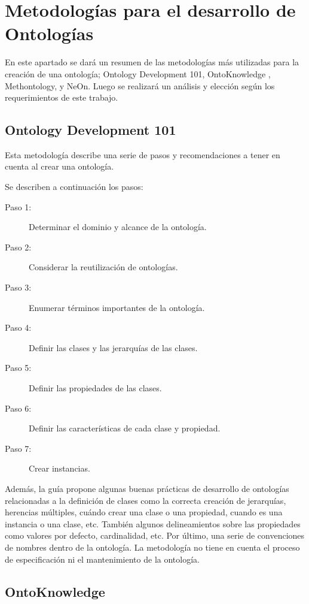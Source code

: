 \section{Metodologías para el desarrollo de Ontologías}

En este apartado se dará un resumen de las metodologías más utilizadas para la creación de una ontología; Ontology Development 101, OntoKnowledge , Methontology, y NeOn. Luego se realizará un análisis y elección según los requerimientos de este trabajo.

\subsection{Ontology Development 101}

Esta metodología describe una serie de pasos y recomendaciones a tener en cuenta al crear una ontología. 

Se describen a continuación los pasos:
\begin{description}
\item[Paso 1:] Determinar el dominio y alcance de la ontología.
\item[Paso 2:] Considerar la reutilización de ontologías.
\item[Paso 3:] Enumerar términos importantes de la ontología.
\item[Paso 4:] Definir las clases y las jerarquías de las clases.
\item[Paso 5:] Definir las propiedades de las clases.
\item[Paso 6:] Definir las características de cada clase y propiedad.
\item[Paso 7:] Crear instancias.
\end{description}

Además, la guía propone algunas buenas prácticas de desarrollo de ontologías relacionadas a la definición de clases como la correcta creación de jerarquías, herencias múltiples,  cuándo crear una clase o una propiedad, cuando es una instancia o una clase, etc. También algunos delineamientos sobre las propiedades como valores por defecto, cardinalidad, etc. Por último, una serie de convenciones de nombres dentro de la ontología. La metodología no tiene en cuenta el proceso de especificación ni el mantenimiento de la ontología.

\subsection{OntoKnowledge} 

